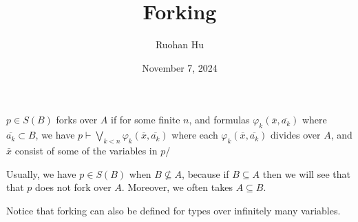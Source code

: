 \documentclass[a4paper]{article}
\title{Forking}
\date{November 7, 2024}
\author{Ruohan Hu}
\begin{document}
\maketitle
\par{ \(p \in  S(B)\) forks over \(A\) if for some finite \(n\), and formulas \(\varphi _k( \overline {x}, \overline {a_{k}})\) where \(\overline {a_k} \subset  B\), we have \(p \vdash \bigvee _{k<n} \varphi _k( \overline {x}, \overline {a_{k}})\) where each \(\varphi _k( \overline {x}, \overline {a_{k}})\) divides over \(A\), and \(\bar {x}\) consist of some of the variables in \(p\)/

Usually, we have \(p \in  S(B)\) when \(B \not \subseteq  A\), because if \(B \subseteq  A\) then we will see that that \(p\) does not fork over \(A\). Moreover, we often takes \(A \subseteq  B\).

Notice that forking can also be defined for types over infinitely many variables.
}
\printbibliography
\end{document}
